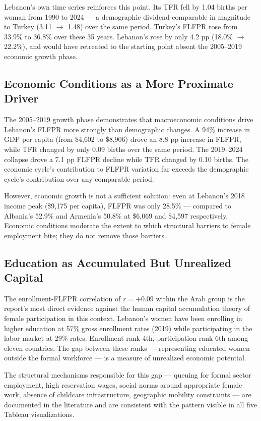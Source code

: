 \documentclass[12pt,a4paper]{article}
\begin{document}
Lebanon's own time series reinforces this point. Its TFR fell by 1.04 births per woman from 1990 to 2024 --- a demographic dividend comparable in magnitude to Turkey (3.11 $\to$ 1.48) over the same period. Turkey's FLFPR rose from 33.9\% to 36.8\% over these 35 years. Lebanon's rose by only 4.2 pp (18.0\% $\to$ 22.2\%), and would have retreated to the starting point absent the 2005--2019 economic growth phase.

\subsection{Economic Conditions as a More Proximate Driver}

The 2005--2019 growth phase demonstrates that macroeconomic conditions drive Lebanon's FLFPR more strongly than demographic changes. A 94\% increase in GDP per capita (from \$4{,}602 to \$8{,}906) drove an 8.8 pp increase in FLFPR, while TFR changed by only 0.09 births over the same period. The 2019--2024 collapse drove a 7.1 pp FLFPR decline while TFR changed by 0.10 births. The economic cycle's contribution to FLFPR variation far exceeds the demographic cycle's contribution over any comparable period.

However, economic growth is not a sufficient solution: even at Lebanon's 2018 income peak (\$9{,}175 per capita), FLFPR was only 28.5\% --- compared to Albania's 52.9\% and Armenia's 50.8\% at \$6{,}069 and \$4{,}597 respectively. Economic conditions moderate the extent to which structural barriers to female employment bite; they do not remove those barriers.

\subsection{Education as Accumulated But Unrealized Capital}

The enrollment-FLFPR correlation of $r = +0.09$ within the Arab group is the report's most direct evidence against the human capital accumulation theory of female participation in this context. Lebanon's women have been enrolling in higher education at 57\% gross enrollment rates (2019) while participating in the labor market at 29\% rates. Enrollment rank 4th, participation rank 6th among eleven countries. The gap between these ranks --- representing educated women outside the formal workforce --- is a measure of unrealized economic potential.

The structural mechanisms responsible for this gap --- queuing for formal sector employment, high reservation wages, social norms around appropriate female work, absence of childcare infrastructure, geographic mobility constraints --- are documented in the literature \citep{assaad2020, majbouri2020} and are consistent with the pattern visible in all five Tableau visualizations.
\end{document}

